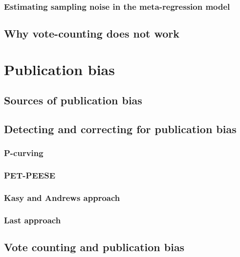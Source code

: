 \documentclass[]{book}
\theoremstyle{definition}
\theoremstyle{definition}
\theoremstyle{definition}
\theoremstyle{remark}
\begin{document}
\subsubsection{Estimating sampling noise in the meta-regression
model}\label{estimating-sampling-noise-in-the-meta-regression-model}

\subsection{Why vote-counting does not
work}\label{why-vote-counting-does-not-work}

\section{Publication bias}\label{publication-bias}

\subsection{Sources of publication
bias}\label{sources-of-publication-bias}

\subsection{Detecting and correcting for publication
bias}\label{detecting-and-correcting-for-publication-bias}

\subsubsection{P-curving}\label{p-curving}

\subsubsection{PET-PEESE}\label{pet-peese}

\subsubsection{Kasy and Andrews
approach}\label{kasy-and-andrews-approach}

\subsubsection{Last approach}\label{last-approach}

\subsection{Vote counting and publication
bias}\label{vote-counting-and-publication-bias}
\end{document}
